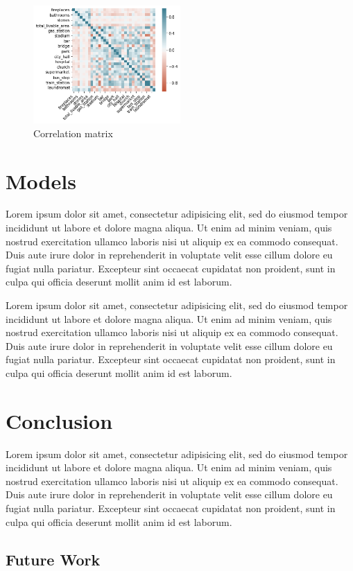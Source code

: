 \documentclass[11pt,a4paper]{article}
\begin{document}
\begin{figure}[h]
\centering
\includegraphics[width=0.5\textwidth]{correlation_matrix}
\caption{Correlation matrix}
\label{fig:corr}
\end{figure}


\section{Models}

Lorem ipsum dolor sit amet, consectetur adipisicing elit, sed do eiusmod
tempor incididunt ut labore et dolore magna aliqua. Ut enim ad minim veniam,
quis nostrud exercitation ullamco laboris nisi ut aliquip ex ea commodo
consequat. Duis aute irure dolor in reprehenderit in voluptate velit esse
cillum dolore eu fugiat nulla pariatur. Excepteur sint occaecat cupidatat non
proident, sunt in culpa qui officia deserunt mollit anim id est laborum.

Lorem ipsum dolor sit amet, consectetur adipisicing elit, sed do eiusmod
tempor incididunt ut labore et dolore magna aliqua. Ut enim ad minim veniam,
quis nostrud exercitation ullamco laboris nisi ut aliquip ex ea commodo
consequat. Duis aute irure dolor in reprehenderit in voluptate velit esse
cillum dolore eu fugiat nulla pariatur. Excepteur sint occaecat cupidatat non
proident, sunt in culpa qui officia deserunt mollit anim id est laborum.

\section{Conclusion}

Lorem ipsum dolor sit amet, consectetur adipisicing elit, sed do eiusmod
tempor incididunt ut labore et dolore magna aliqua. Ut enim ad minim veniam,
quis nostrud exercitation ullamco laboris nisi ut aliquip ex ea commodo
consequat. Duis aute irure dolor in reprehenderit in voluptate velit esse
cillum dolore eu fugiat nulla pariatur. Excepteur sint occaecat cupidatat non
proident, sunt in culpa qui officia deserunt mollit anim id est laborum.

\subsection{Future Work}




\end{document}
